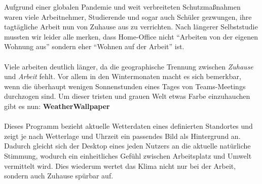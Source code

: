Aufgrund einer globalen Pandemie und weit verbreiteten Schutzmaßnahmen waren viele Arbeitnehmer, Studierende und sogar auch Schüler gezwungen, ihre tagtägliche Arbeit nun von Zuhause aus zu verrichten.
Nach längerer Selbststudie mussten wir leider alle merken, dass Home-Office nicht \enquote{Arbeiten von der eigenen Wohnung aus} sondern eher  \enquote{Wohnen auf der Arbeit} ist.\\
\\
Viele arbeiten deutlich länger, da die geographische Trennung zwischen \textit{Zuhause} und \textit{Arbeit} fehlt.
Vor allem in den Wintermonaten macht es sich bemerkbar, wenn die überhaupt wenigen Sonnenstunden eines Tages von Teams-Meetings durchzogen sind.
Um dieser tristen und grauen Welt etwas Farbe einzuhauchen gibt es nun: \textbf{WeatherWallpaper}\\
\\
Dieses Programm bezieht aktuelle Wetterdaten eines definierten Standortes und zeigt je nach Wetterlage und Uhrzeit ein passendes Bild als Hintergrund an.
Dadurch gleicht sich der Desktop eines jeden Nutzers an die aktuelle natürliche Stimmung, wodurch ein einheitliches Gefühl zwischen Arbeitsplatz und Umwelt vermittelt wird.
Dies wiederum wertet das Klima nicht nur bei der Arbeit, sondern auch Zuhause spürbar auf.
